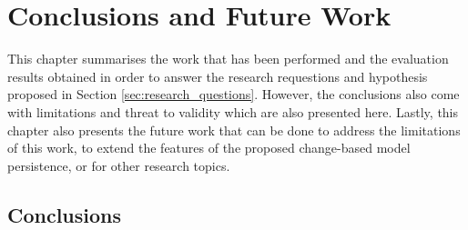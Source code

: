 \chapter{Conclusions and Future Work}
\label{ch:conclusions_and_future_work}

This chapter summarises the work that has been performed and the evaluation results obtained in order to answer the research requestions and hypothesis proposed in Section \ref{sec:research_questions}. However, the conclusions also come with limitations and threat to validity which are also presented here. Lastly, this chapter also presents the future work that can be done to address the limitations of this work, to extend the features of the proposed change-based model persistence, or for other research topics.

\section{Conclusions}
\label{conclusions_overall}
